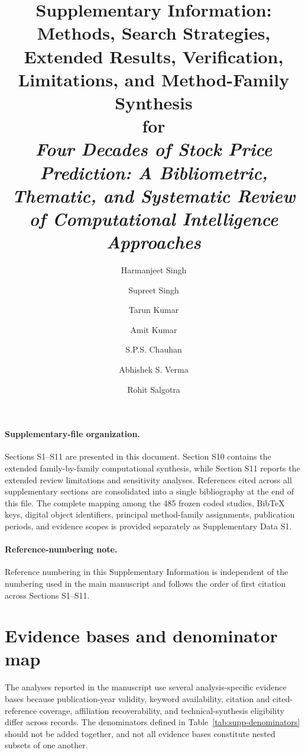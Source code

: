 \documentclass[12pt]{article}
\numberwithin{equation}{section}
\begin{document}
\title{
Supplementary Information: Methods, Search Strategies,
Extended Results, Verification, Limitations, and
Method-Family Synthesis\\[3pt]
for\\[3pt]
\textit{Four Decades of Stock Price Prediction:
A Bibliometric, Thematic, and Systematic Review of
Computational Intelligence Approaches}
}

\author{Harmanjeet Singh \and Supreet Singh \and Tarun Kumar \and Amit Kumar  \and S.P.S. Chauhan \and Abhishek S. Verma \and Rohit Salgotra}


\maketitle

\noindent


\tableofcontents
\vspace{1.5em}
\noindent
\paragraph{Supplementary-file organization.}
Sections S1--S11 are presented in this document.
Section S10 contains the extended family-by-family computational synthesis,
while Section S11 reports the extended review limitations and sensitivity
analyses. References cited across all supplementary sections are consolidated
into a single bibliography at the end of this file. The complete mapping among
the 485 frozen coded studies, BibTeX keys, digital object identifiers, principal
method-family assignments, publication periods, and evidence scopes is provided
separately as Supplementary Data S1.

\paragraph{Reference-numbering note.}
Reference numbering in this Supplementary Information is independent of the
numbering used in the main manuscript and follows the order of first citation
across Sections S1--S11.

\clearpage



\section{Evidence bases and denominator map}
\label{sec:supp-denominators}

The analyses reported in the manuscript use several analysis-specific
evidence bases because publication-year validity, keyword availability,
citation and cited-reference coverage, affiliation recoverability, and
technical-synthesis eligibility differ across records. The denominators
defined in Table~\ref{tab:supp-denominators} should not be added
together, and not all evidence bases constitute nested subsets of one
another.
\end{document}
